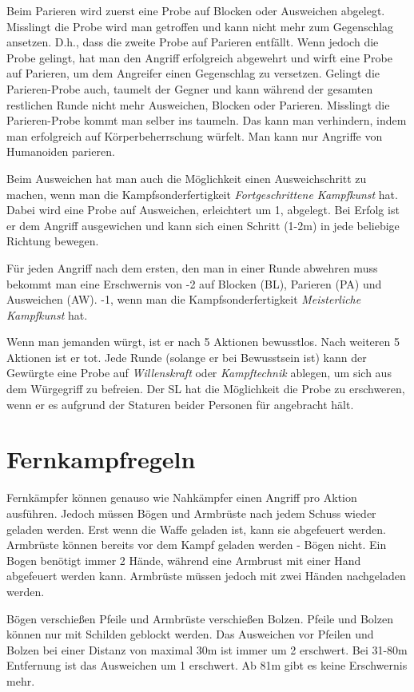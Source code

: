 Beim Parieren wird zuerst eine Probe auf Blocken oder Ausweichen abgelegt. Misslingt die Probe wird man getroffen und kann nicht mehr zum Gegenschlag ansetzen. D.h., dass die zweite Probe auf Parieren entfällt. Wenn jedoch die Probe gelingt, hat man den Angriff erfolgreich abgewehrt und wirft eine Probe auf Parieren, um dem Angreifer einen Gegenschlag zu versetzen. Gelingt die Parieren-Probe auch, taumelt der Gegner und kann während der gesamten restlichen Runde nicht mehr Ausweichen, Blocken oder Parieren. Misslingt die Parieren-Probe kommt man selber ins taumeln. Das kann man verhindern, indem man erfolgreich auf Körperbeherrschung würfelt. Man kann nur Angriffe von Humanoiden parieren.

Beim Ausweichen hat man auch die Möglichkeit einen Ausweichschritt zu machen, wenn man die Kampfsonderfertigkeit \textit{Fortgeschrittene Kampfkunst} hat. Dabei wird eine Probe auf Ausweichen, erleichtert um 1, abgelegt. Bei Erfolg ist er dem Angriff ausgewichen und kann sich einen Schritt (1-2m) in jede beliebige Richtung bewegen.

Für jeden Angriff nach dem ersten, den man in einer Runde abwehren muss bekommt man eine Erschwernis von -2 auf Blocken (BL), Parieren (PA) und Ausweichen (AW). -1, wenn man die Kampfsonderfertigkeit \textit{Meisterliche Kampfkunst} hat.

Wenn man jemanden würgt, ist er nach 5 Aktionen bewusstlos. Nach weiteren 5 Aktionen ist er tot. Jede Runde (solange er bei Bewusstsein ist) kann der Gewürgte eine Probe auf \textit{Willenskraft} oder \textit{Kampftechnik} ablegen, um sich aus dem Würgegriff zu befreien. Der SL hat die Möglichkeit die Probe zu erschweren, wenn er es aufgrund der Staturen beider Personen für angebracht hält.

\section{Fernkampfregeln}
Fernkämpfer können genauso wie Nahkämpfer einen Angriff pro Aktion ausführen. Jedoch müssen Bögen und Armbrüste nach jedem Schuss wieder geladen werden. Erst wenn die Waffe geladen ist, kann sie abgefeuert werden. Armbrüste können bereits vor dem Kampf geladen werden - Bögen nicht. Ein Bogen benötigt immer 2 Hände, während eine Armbrust mit einer Hand abgefeuert werden kann. Armbrüste müssen jedoch mit zwei Händen nachgeladen werden. 

Bögen verschießen Pfeile und Armbrüste verschießen Bolzen. Pfeile und Bolzen können nur mit Schilden geblockt werden. Das Ausweichen vor Pfeilen und Bolzen bei einer Distanz von maximal 30m ist immer um 2 erschwert. Bei 31-80m Entfernung ist das Ausweichen um 1 erschwert. Ab 81m gibt es keine Erschwernis mehr.

